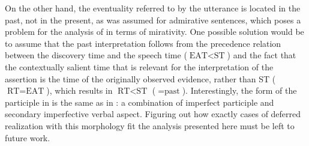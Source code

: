\documentclass[output=paper]{langscibook}
\begin{document}
On the other hand, the eventuality referred to by the utterance is located in the past, not in the present, as was assumed for admirative sentences, which poses a problem for the analysis of  in terms of mirativity.
One possible solution would be to assume that the past interpretation follows from the precedence relation between the discovery time and the speech time ($\text{EAT}<\text{ST}$) and the fact that the contextually salient time that is relevant for the interpretation of the assertion is the time of the originally observed evidence, rather than ST ($\text{RT}=\text{EAT}$), which results in $\text{RT}<\text{ST}$ (${}=\text{past}$).
Interestingly, the form of the participle in  is the same as in : a combination of imperfect participle and secondary imperfective verbal aspect. Figuring out how exactly cases of deferred realization with this morphology fit the analysis presented here must be left to future work.






\end{document}
